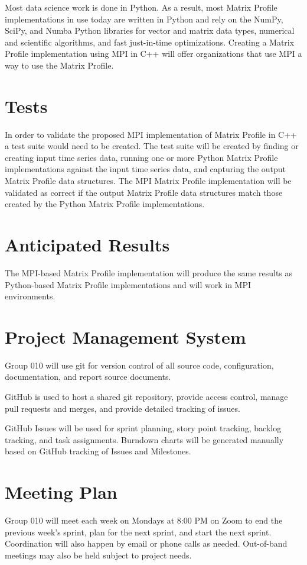 \documentclass[conference]{IEEEtran}
\begin{document}
Most data science work is done in Python.  As a result, most Matrix Profile implementations in use today are written in Python \cite{Stumpy} and rely on the NumPy, SciPy, and Numba Python libraries for vector and matrix data types, numerical and scientific algorithms, and fast just-in-time optimizations.  Creating a Matrix Profile implementation using MPI in C++ will offer organizations that use MPI a way to use the Matrix Profile. 

\section{Tests}
In order to validate the proposed MPI implementation of Matrix Profile in C++ a test suite would need to be created.  The test suite will be created by finding or creating input time series data, running one or more Python Matrix Profile implementations against the input time series data, and capturing the output Matrix Profile data structures.  The MPI Matrix Profile implementation will be validated as correct if the output Matrix Profile data structures match those created by the Python Matrix Profile implementations. 

\section{Anticipated Results}
The MPI-based Matrix Profile implementation will produce the same results as Python-based Matrix Profile implementations and will work in MPI environments.

\section{Project Management System}
Group 010 will use git for version control of all source code, configuration, documentation, and report source documents.  

GitHub is used to host a shared git repository, provide access control, manage pull requests and merges, and provide detailed tracking of issues.

GitHub Issues will be used for sprint planning, story point tracking, backlog tracking, and task assignments. Burndown charts will be generated manually based on GitHub tracking of Issues and Milestones. 

\section{Meeting Plan}
Group 010 will meet each week on Mondays at 8:00 PM on Zoom to end the previous week's sprint, plan for the next sprint, and start the next sprint.  Coordination will also happen by email or phone calls as needed.  Out-of-band meetings may also be held subject to project needs.
\end{document}
